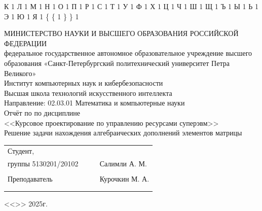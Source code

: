 \documentclass[a4paper, final]{article}
\begin{document}
{  {К}{ {\selectfont{}} }1
  {Л}{ {\selectfont{}} }1
  {М}{ {\selectfont{}} }1
  {Н}{ {\selectfont{}} }1
  {О}{ {\selectfont{}} }1
  {П}{ {\selectfont{}} }1
  {Р}{ {\selectfont{}} }1
  {С}{ {\selectfont{}} }1
  {Т}{ {\selectfont{}} }1
  {У}{ {\selectfont{}} }1
  {Ф}{ {\selectfont{}} }1
  {Х}{ {\selectfont{}} }1
  {Ц}{ {\selectfont{}} }1
  {Ч}{ {\selectfont{}} }1
  {Ш}{ {\selectfont{}} }1
  {Щ}{ {\selectfont{}} }1
  {Ъ}{ {\selectfont{}} }1
  {Ы}{ {\selectfont{}} }1
  {Ь}{ {\selectfont{}} }1
  {Э}{ {\selectfont{}} }1
  {Ю}{ {\selectfont{}} }1
  {Я}{ {\selectfont{}} }1
  {\{}{ { {\color{brackets}\{} } }1 %
  {\} }{ { {\color{brackets}\} } } }1 %
}
\thispagestyle{empty}
\begin{center}
\hfill \break
\hfill \break
\normalsize{МИНИСТЕРСТВО НАУКИ И ВЫСШЕГО ОБРАЗОВАНИЯ РОССИЙСКОЙ ФЕДЕРАЦИИ\\
 федеральное государственное автономное образовательное учреждение высшего образования «Санкт-Петербургский политехнический университет Петра Великого»\\[10pt]}
\normalsize{Институт компьютерных наук и кибербезопасности}\\[10pt] 
\normalsize{Высшая школа технологий искусственного интеллекта}\\[10pt] 
\normalsize{Направление: 02.03.01 Математика и компьютерные науки}\\

\hfill \break
\hfill \break
\hfill \break
\large{Отчёт по по дисциплине}\\
\large{<<Курсовое проектирование по управлению ресурсами суперэвм>>}\\
\large{Решение задачи нахождения алгебраических дополнений элементов матрицы}\\
\hfill \break
\vspace{2cm}


\end{center}
 
\small{ 
\begin{tabular}{lrrl}
\!\!\!Студент, & \hspace{2cm} & & \\
\!\!\!группы 5130201/20102 & \hspace{2cm} & \underline{\hspace{3cm}} &Салимли А. М. \\\\
\!\!\!Преподаватель & \hspace{2cm} & \underline{\hspace{3cm}} & Курочкин М. А. \\\\
&&\hspace{5cm}
\end{tabular}
\begin{flushright}
<<\underline{\hspace{1cm}}>>\underline{\hspace{2.5cm}} 2025г.
\end{flushright}
}
\hfill \break
\end{document}
